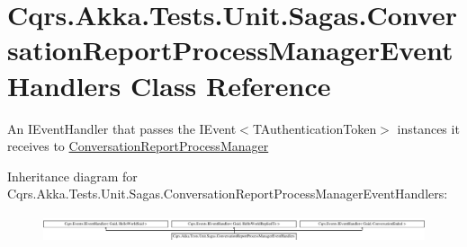 \hypertarget{classCqrs_1_1Akka_1_1Tests_1_1Unit_1_1Sagas_1_1ConversationReportProcessManagerEventHandlers}{}\section{Cqrs.\+Akka.\+Tests.\+Unit.\+Sagas.\+Conversation\+Report\+Process\+Manager\+Event\+Handlers Class Reference}
\label{classCqrs_1_1Akka_1_1Tests_1_1Unit_1_1Sagas_1_1ConversationReportProcessManagerEventHandlers}


An I\+Event\+Handler that passes the I\+Event$<$\+T\+Authentication\+Token$>$ instances it receives to \hyperlink{classCqrs_1_1Akka_1_1Tests_1_1Unit_1_1Sagas_1_1ConversationReportProcessManager}{Conversation\+Report\+Process\+Manager}  


Inheritance diagram for Cqrs.\+Akka.\+Tests.\+Unit.\+Sagas.\+Conversation\+Report\+Process\+Manager\+Event\+Handlers\+:\begin{figure}[H]
\begin{center}
\leavevmode
\includegraphics[height=0.792640cm]{classCqrs_1_1Akka_1_1Tests_1_1Unit_1_1Sagas_1_1ConversationReportProcessManagerEventHandlers}
\end{center}
\end{figure}
